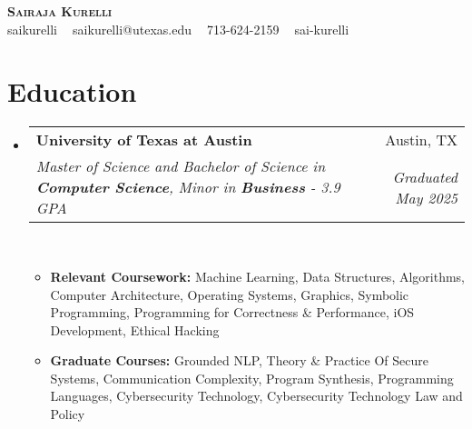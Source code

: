 \documentclass[letterpaper,11pt]{article}
\makeatletter
\newcommand{\resumeItem}[1]{
  \item\small{
    {#1 \vspace{-2pt}}
  }
}
\newcommand{\resumeSubLineheading}[6]{
  \vspace{-2pt}\item
    \begin{tabular*}{0.97\textwidth}[t]{l@{\extracolsep{\fill}}r}
      \textbf{#1} & #2 \\
      \textit{\small#3} & \textit{\small #5} \\
    \end{tabular*}\vspace{-7pt}
}
\newcommand{\resumeSubHeadingListStart}{\begin{itemize}[leftmargin=0.15in, label={}]}
\newcommand{\resumeSubHeadingListEnd}{\end{itemize}}
\newcommand{\resumeItemListStart}{\begin{itemize}}
\newcommand{\resumeItemListEnd}{\end{itemize}\vspace{-5pt}}
\makeatother
\begin{document}

\begin{center}
	\textbf{\huge \scshape Sairaja Kurelli} \\ \vspace{3pt}
	\small \faGithub{} saikurelli $\;\;$ \faEnvelope{} saikurelli@utexas.edu $\;\;$ \faPhone{} 713-624-2159 $\;\;$\faLinkedin{} sai-kurelli
\end{center}


\section{Education}
\resumeSubHeadingListStart
\resumeSubLineheading
{University of Texas at Austin}{Austin, TX}
{Master of Science and Bachelor of Science in \textbf{Computer Science}, Minor in \textbf{Business} - 3.9 GPA}
{}{Graduated May 2025} {}
\\
\resumeItemListStart
\resumeItem{\small \textbf{Relevant Coursework:} Machine Learning, Data Structures, Algorithms,
	Computer Architecture, Operating Systems, Graphics, Symbolic Programming, Programming for Correctness \& Performance,
	iOS Development, Ethical Hacking} %
\resumeItem{\small \textbf{Graduate Courses:} Grounded NLP, Theory \& Practice Of Secure Systems, Communication Complexity, Program Synthesis, Programming Languages, Cybersecurity Technology, Cybersecurity Technology Law and Policy}


\resumeItemListEnd
\resumeSubHeadingListEnd
\end{document}
